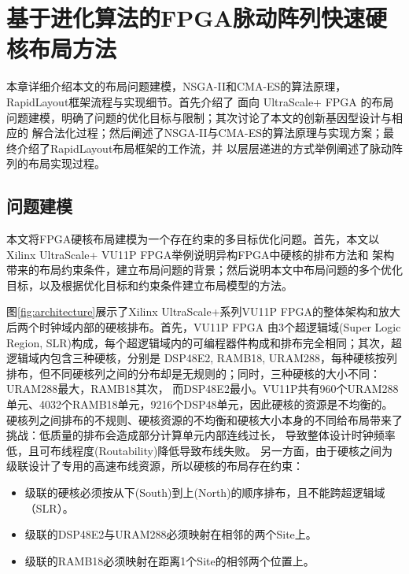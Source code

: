 \chapter{基于进化算法的FPGA脉动阵列快速硬核布局方法}

本章详细介绍本文的布局问题建模，NSGA-II和CMA-ES的算法原理，RapidLayout框架流程与实现细节。首先介绍了
面向 UltraScale+ FPGA 的布局问题建模，明确了问题的优化目标与限制；其次讨论了本文的创新基因型设计与相应的
解合法化过程；然后阐述了NSGA-II与CMA-ES的算法原理与实现方案；最终介绍了RapidLayout布局框架的工作流，并
以层层递进的方式举例阐述了脉动阵列的布局实现过程。

\section{问题建模}

本文将FPGA硬核布局建模为一个存在约束的多目标优化问题。首先，本文以Xilinx UltraScale+ VU11P FPGA举例说明异构FPGA中硬核的排布方法和
架构带来的布局约束条件，建立布局问题的背景；然后说明本文中布局问题的多个优化目标，以及根据优化目标和约束条件建立布局模型的方法。

图\ref{fig:architecture}展示了Xilinx UltraScale+系列VU11P FPGA的整体架构和放大后两个时钟域内部的硬核排布。首先，VU11P FPGA
由3个超逻辑域(Super Logic Region, SLR)构成，每个超逻辑域内的可编程器件构成和排布完全相同；其次，超逻辑域内包含三种硬核，分别是
DSP48E2, RAMB18, URAM288，每种硬核按列排布，但不同硬核列之间的分布却是无规则的；同时，三种硬核的大小不同：URAM288最大，RAMB18其次，
而DSP48E2最小。VU11P共有960个URAM288单元、4032个RAMB18单元，9216个DSP48单元，因此硬核的资源是不均衡的。
硬核列之间排布的不规则、硬核资源的不均衡和硬核大小本身的不同给布局带来了挑战：低质量的排布会造成部分计算单元内部连线过长，
导致整体设计时钟频率低，且可布线程度(Routability)降低导致布线失败。
另一方面，由于硬核之间为级联设计了专用的高速布线资源，所以硬核的布局存在约束：
\begin{itemize}
    \item 级联的硬核必须按从下(South)到上(North)的顺序排布，且不能跨超逻辑域（SLR）。
    \item 级联的DSP48E2与URAM288必须映射在相邻的两个Site上。
    \item 级联的RAMB18必须映射在距离1个Site的相邻两个位置上。
\end{itemize}



